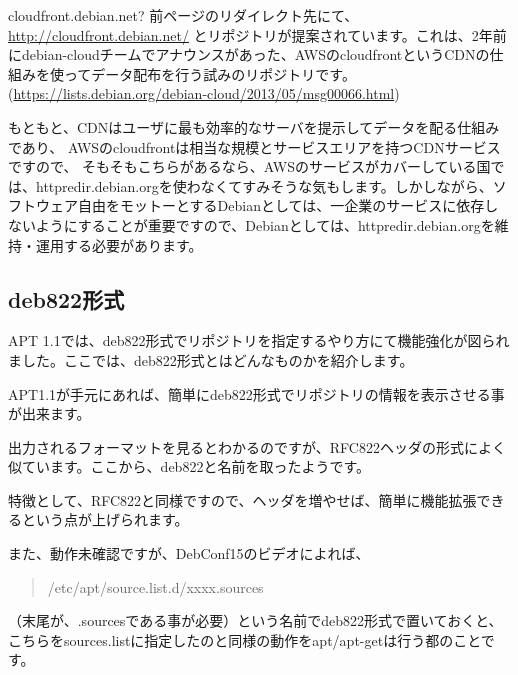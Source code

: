 \documentclass[mingoth,a4paper]{jsarticle}
\begin{document}
{ \scriptsize
 \begin{itembox}[l]{cloudfront.debian.net?}
 前ページのリダイレクト先にて、
\url{http://cloudfront.debian.net/}
とリポジトリが提案されています。これは、2年前にdebian-cloudチームでアナウンスがあった、AWSのcloudfrontというCDNの仕組みを使ってデータ配布を行う試みのリポジトリです。
(\url{https://lists.debian.org/debian-cloud/2013/05/msg00066.html})

 もともと、CDNはユーザに最も効率的なサーバを提示してデータを配る仕組みであり、
AWSのcloudfrontは相当な規模とサービスエリアを持つCDNサービスですので、
そもそもこちらがあるなら、AWSのサービスがカバーしている国では、httpredir.debian.orgを使わなくてすみそうな気もします。しかしながら、ソフトウェア自由をモットーとするDebianとしては、一企業のサービスに依存しないようにすることが重要ですので、Debianとしては、httpredir.debian.orgを維持・運用する必要があります。
 \end{itembox}
}

\subsection{deb822形式}

 APT 1.1では、deb822形式でリポジトリを指定するやり方にて機能強化が図られました。ここでは、deb822形式とはどんなものかを紹介します。

 APT1.1が手元にあれば、簡単にdeb822形式でリポジトリの情報を表示させる事が出来ます。

  
 出力されるフォーマットを見るとわかるのですが、RFC822ヘッダの形式によく似ています。ここから、deb822と名前を取ったようです。

  特徴として、RFC822と同様ですので、ヘッダを増やせば、簡単に機能拡張できるという点が上げられます。

  また、動作未確認ですが、DebConf15のビデオによれば、
\begin{quote}
  /etc/apt/source.list.d/xxxx.sources
\end{quote}
（末尾が、.sourcesである事が必要）という名前でdeb822形式で置いておくと、
こちらをsources.listに指定したのと同様の動作をapt/apt-getは行う都のことです。
  
\end{document}
